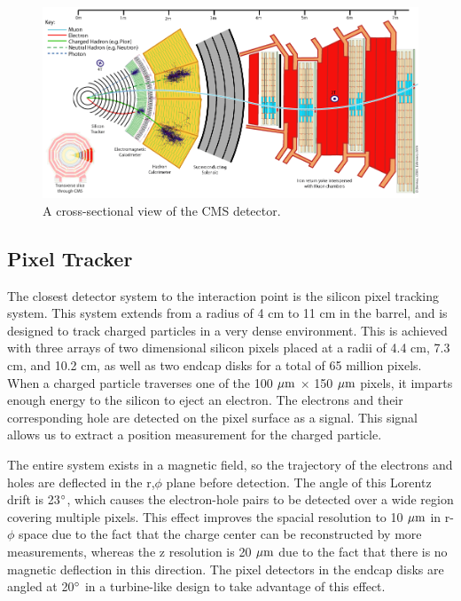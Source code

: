 \begin{figure}
\begin{center}
\includegraphics[width=1.0\linewidth]{figs/CMSdiagram.png}
\caption{A cross-sectional view of the CMS detector.}
\label{figs:CMSdiagram}
\end{center}
\end{figure}



\subsection{Pixel Tracker}
The closest detector system to the interaction point is the silicon pixel tracking system.  
This system extends from a radius of 4 cm to 11 cm in the barrel, and is designed to track charged particles in a very dense environment.  
This is achieved with three arrays of two dimensional silicon pixels placed at a radii of 4.4 cm, 7.3 cm, and 10.2 cm, as well as two endcap disks for a total of 65 million pixels.  
When a charged particle traverses one of the 100 $\mum$ $\times$ 150 $\mum$ pixels, it imparts enough energy to the silicon to eject an electron.  
The electrons and their corresponding hole are detected on the pixel surface as a signal.  
This signal allows us to extract a position measurement for the charged particle.  

The entire system exists in a magnetic field, so the trajectory of the electrons and holes are deflected in the r,$\phi$ plane before detection.  
The angle of this Lorentz drift is 23$\textdegree$, which causes the electron-hole pairs to be detected over a wide region covering multiple pixels.  
This effect improves the spacial resolution to 10 $\mum$ in r-$\phi$ space due to the fact that the charge center can be reconstructed by more measurements, 
whereas the z resolution is 20 $\mum$ due to the fact that there is no magnetic deflection in this direction. 
The pixel detectors in the endcap disks are angled at 20$\textdegree$ in a turbine-like design to take advantage of this effect.  

